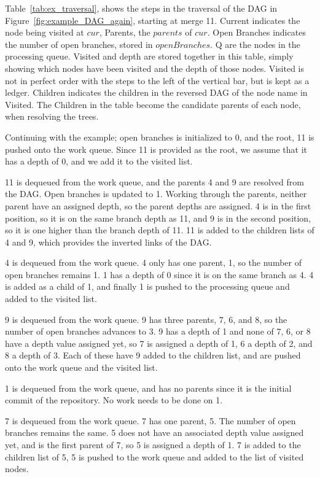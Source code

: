 Table~\ref{tab:ex_traversal}, shows the steps in the traversal of the
DAG in Figure~\ref{fig:example_DAG_again}, starting at merge 11. Current
indicates the node being visited at $cur$, Parents, the $parents$ of
$cur$. Open Branches indicates the number of open branches, stored in
$openBranches$. Q are the nodes in the processing queue. Visited and
depth are stored together in this table, simply showing which nodes have
been visited and the depth of those nodes. Visited is not in perfect
order with the steps to the left of the vertical bar, but is kept as a
ledger. Children indicates the children in the reversed DAG of the node
name in Visited. The Children in the table become the candidate parents
of each node, when resolving the trees.

Continuing with the example; open branches is initialized to 0, and the
root, 11 is pushed onto the work queue. Since 11 is provided as the
root, we assume that it has a depth of 0, and we add it to the visited
list.

11 is dequeued from the work queue, and the parents 4 and 9 are resolved
from the DAG. Open branches is updated to 1. Working through the
parents, neither parent have an assigned depth, so the parent depths are
assigned. 4 is in the first position, so it is on the same branch depth
as 11, and 9 is in the second position, so it is one higher than the
branch depth of 11. 11 is added to the children lists of 4 and 9, which
provides the inverted links of the DAG.

4 is dequeued from the work queue. 4 only has one parent, 1, so the
number of open branches remains 1. 1 has a depth of 0 since it is on the
same branch as 4. 4 is added as a child of 1, and finally 1 is pushed to
the processing queue and added to the visited list.

9 is dequeued from the work queue. 9 has three parents, 7, 6, and 8, so
the number of open branches advances to 3. 9 has a depth of 1 and none
of 7, 6, or 8 have a depth value assigned yet, so 7 is assigned a depth
of 1, 6 a depth of 2, and 8 a depth of 3. Each of these have 9 added to
the children list, and are pushed onto the work queue and the visited
list.

1 is dequeued from the work queue, and has no parents since it is the
initial commit of the repository. No work needs to be done on 1.

7 is dequeued from the work queue. 7 has one parent, 5. The number of
open branches remains the same. 5 does not have an associated depth
value assigned yet, and is the first parent of 7, so 5 is assigned a
depth of 1. 7 is added to the children list of 5, 5 is pushed to the
work queue and added to the list of visited nodes.


